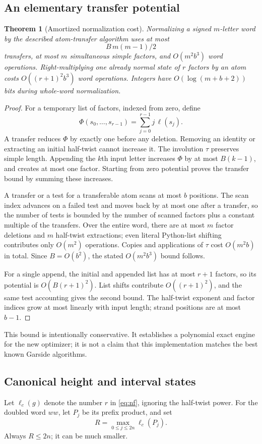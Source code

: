 \documentclass[11pt,a4paper]{article}
\newtheorem{theorem}{Theorem}[section]
\theoremstyle{definition}\newtheorem{definition}[theorem]{Definition}
\theoremstyle{remark}\newtheorem{remark}[theorem]{Remark}
\begin{document}
\subsection{An elementary transfer potential}
\begin{theorem}[Amortized normalization cost]\label{thm:normalcost}
Normalizing a signed $m$-letter word by the described atom-transfer algorithm
uses at most
\[
 B\,m(m-1)/2
\]
transfers, at most $m$ simultaneous simple factors, and
$O(m^2b^3)$ word operations. Right-multiplying one already normal state of
$r$ factors by an atom costs $O((r+1)^2b^3)$ word operations. Integers have
$O(\log(m+b+2))$ bits during whole-word normalization.
\end{theorem}
\begin{proof}
For a temporary list of factors, indexed from zero, define
\[
 \Phi(s_0,\ldots,s_{r-1})=\sum_{j=0}^{r-1}j\,\ell(s_j).
\]
A transfer reduces $\Phi$ by exactly one before any deletion. Removing an
identity or extracting an initial half-twist cannot increase it. The
involution $\tau$ preserves simple length. Appending the $k$th input letter
increases $\Phi$ by at most $B(k-1)$, and creates at most one factor. Starting
from zero potential proves the transfer bound by summing these increases.

A transfer or a test for a transferable atom scans at most $b$ positions.
The scan index advances on a failed test and moves back by at most one after
a transfer, so the number of tests is bounded by the number of scanned
factors plus a constant multiple of the transfers. Over the entire word,
there are at most $m$ factor deletions and $m$ half-twist extractions;
even literal Python-list shifting contributes only $O(m^2)$ operations.
Copies and applications of $\tau$ cost $O(m^2b)$ in total. Since $B=O(b^2)$,
the stated $O(m^2b^3)$ bound follows.

For a single append, the initial and appended list has at most $r+1$ factors,
so its potential is $O(B(r+1)^2)$. List shifts contribute $O((r+1)^2)$,
and the same test accounting gives the second bound. The half-twist exponent
and factor indices grow at most linearly with input length; strand positions
are at most $b-1$.
\end{proof}

This bound is intentionally conservative. It establishes a polynomial exact
engine for the new optimizer; it is not a claim that this implementation
matches the best known Garside algorithms.

\subsection{Canonical height and interval states}
Let $\ell_c(g)$ denote the number $r$ in \eqref{eq:nf}, ignoring the half-twist
power. For the doubled word $ww$, let $P_j$ be its prefix product, and set
\begin{equation}\label{eq:height}
 R=\max_{0\le j\le2n}\ell_c(P_j).
\end{equation}
Always $R\le2n$; it can be much smaller.
\end{document}
